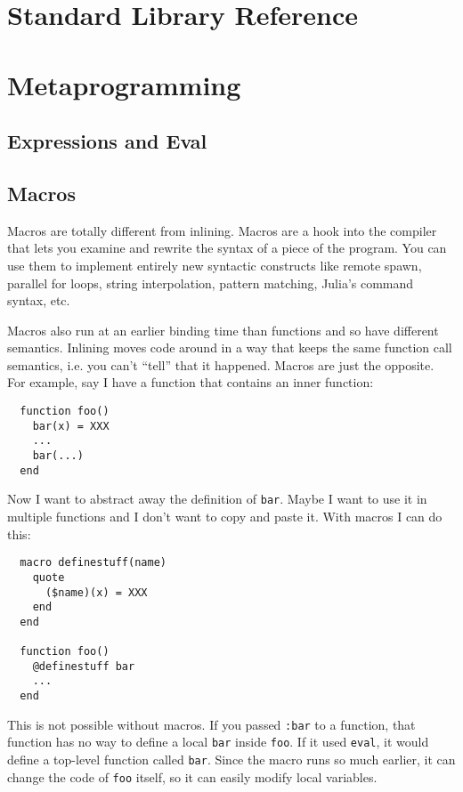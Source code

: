\documentclass{article}
\begin{document}
\section{Standard Library Reference}

\section{Metaprogramming}

\subsection{Expressions and Eval}

\subsection{Macros}

Macros are totally different from inlining.
Macros are a hook into the compiler that lets you examine and rewrite the syntax of a piece of the program.
You can use them to implement entirely new syntactic constructs like remote spawn, parallel for loops, string interpolation, pattern matching, Julia's command syntax, etc.

Macros also run at an earlier binding time than functions and so have different semantics.
Inlining moves code around in a way that keeps the same function call semantics, i.e. you can't ``tell'' that it happened.
Macros are just the opposite.
For example, say I have a function that contains an inner function:

\begin{verbatim}
  function foo()
    bar(x) = XXX
    ...
    bar(...)
  end
\end{verbatim}

Now I want to abstract away the definition of \verb|bar|.
Maybe I want to use it in multiple functions and I don't want to copy and paste it.
With macros I can do this:

\begin{verbatim}
  macro definestuff(name)
    quote
      ($name)(x) = XXX
    end
  end

  function foo()
    @definestuff bar
    ...
  end
\end{verbatim}

This is not possible without macros.
If you passed \verb|:bar| to a function, that function has no way to define a local \verb|bar| inside \verb|foo|.
If it used \verb|eval|, it would define a top-level function called \verb|bar|. 
Since the macro runs so much earlier, it can change the code of \verb|foo| itself, so it can easily modify local variables.
\end{document}
